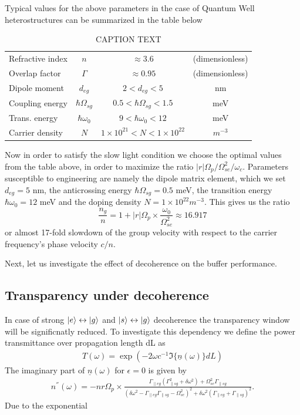 \documentclass[twocolumn,secnumarabic,amssymb, nobibnotes, aps, prd]{revtex4-1}
\begin{document}
Typical values for the above parameters in the case of Quantum Well heterostructures can be summarized in the table below

	\begin{table}[H]
		\centering
		\footnotesize
		\begin{tabular}{ l | c c c }	
			\hline 
			{Refractive index }  & $n$ &   $\approx 3.6$ & (dimensionless) \\
			{Overlap factor}  & $\Gamma$ &   $\approx 0.95$ & (dimensionless) \\
			{Dipole moment}  & $d_{eg}$ &   $2 < d_{eg} < 5 $ & nm \\
			{Coupling energy}  & $\hbar \Omega_{sg}$ &  $0.5 <\hbar \Omega_{sg} < 1.5$ & meV \\
			{Trans. energy}  & $\hbar\omega_{0}$ & $9 <\hbar\omega_{0}< 12$ & meV \\
			{Carrier density}  & $N$ & $1\times10^{21} <N<  1\times10^{22}$ & $m^{-3}$\\
			\hline 
		\end{tabular}
		\caption[Table caption text]{ CAPTION TEXT}
		\label{tab:table02}
	\end{table}

Now in order to satisfy the slow light condition we choose the optimal values from the table above, in order to maximize the ratio $ |r| \Omega_p / \Omega_{se}^2/\omega_c$. Parameters susceptible to engineering are namely the dipole matrix element, which we set $ d_{eg} = 5$ nm, the anticrossing energy $\hbar\Omega_{sg} = 0.5 $ meV, the transition energy $\hbar \omega_0 = 12$ meV and the doping density $N = 1\times 10^{22} m^{-3}$. This gives us the ratio
$$
\frac{n_g}{n} = 1+|r|\Omega_p\times\frac{\omega_0}{\Omega_{se}^2} \approx  16.917
$$
or almost 17-fold slowdown of the group velocity with respect to the carrier frequency's phase velocity $c/n$. 

Next, let us investigate the effect of decoherence on the buffer performance. 
\subsection{Transparency under decoherence}
In case of strong $\ket{e}\leftrightarrow\ket{g}$ and $\ket{s}\leftrightarrow\ket{g}$ decoherence the transparency window will be significnatly reduced. To investigate this dependency we define the power transmittance over 
propagation length dL as
\begin{align}
T(\omega) = \exp(-2\omega c^{-1} \Im \{\underline{n}(\omega)\}dL)
\end{align}
The imaginary part of $\underline{n}(\omega)$ for $\epsilon = 0$ is given by
\begin{align}
n^{''}(\omega) = -nr\Omega_p\times \frac{\Gamma_{\parallel eg}(\Gamma_{\parallel sg}^2+\delta\omega^2) + \Omega_{se}^{2}\Gamma_{\parallel sg}}{(\delta\omega^2-\Gamma_{\parallel eg}\Gamma_{\parallel sg}-\Omega_{se}^2)^2+\delta\omega^2(\Gamma_{\parallel eg}+\Gamma_{\parallel sg})^2}.
\end{align}
Due to the exponential 
\end{document}
